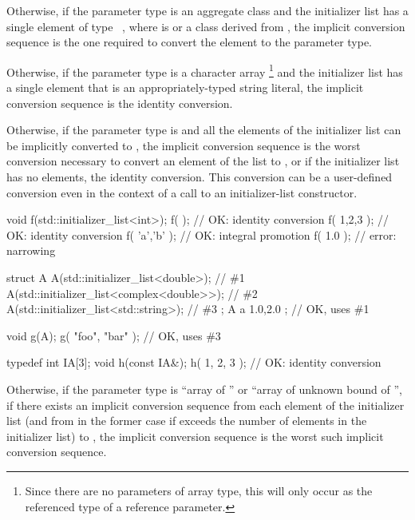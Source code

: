 \pnum
Otherwise,
if the parameter type is an aggregate class  and the initializer list has a
single element of type \cv{}~, where  is 
or a class derived from , the implicit conversion sequence is the one
required to convert the element to the parameter type.

\pnum
Otherwise, if the parameter type is a character array%
\footnote{Since there are no parameters of array type,
this will only occur as the referenced type of a reference parameter.}
and the initializer list has a single element that is an appropriately-typed
string literal, the implicit conversion
sequence is the identity conversion.

\pnum
Otherwise, if the parameter type is 
and all the elements
of the initializer list can be implicitly converted to , the implicit
conversion sequence is the worst conversion necessary to convert an element of
the list to , or if the initializer list has no elements, the identity
conversion. This conversion can be a user-defined conversion even in
the context of a call to an initializer-list constructor. \begin{example}
\begin{codeblock}
void f(std::initializer_list<int>);
f( {} );                        // OK:  identity conversion
f( {1,2,3} );                   // OK:  identity conversion
f( {'a','b'} );                 // OK:  integral promotion
f( {1.0} );                     // error: narrowing

struct A {
  A(std::initializer_list<double>);             // \#1
  A(std::initializer_list<complex<double>>);    // \#2
  A(std::initializer_list<std::string>);        // \#3
};
A a{ 1.0,2.0 };                 // OK, uses \#1

void g(A);
g({ "foo", "bar" });            // OK, uses \#3

typedef int IA[3];
void h(const IA&);
h({ 1, 2, 3 });                 // OK: identity conversion
\end{codeblock}
\end{example}

\pnum
Otherwise, if the parameter type is ``array of  ''
or ``array of unknown bound of '',
if there exists an implicit conversion sequence
from each element of the initializer list
(and from \tcode{\{\}} in the former case
if  exceeds the number of elements in the initializer list)
to , the implicit conversion sequence is
the worst such implicit conversion sequence.

